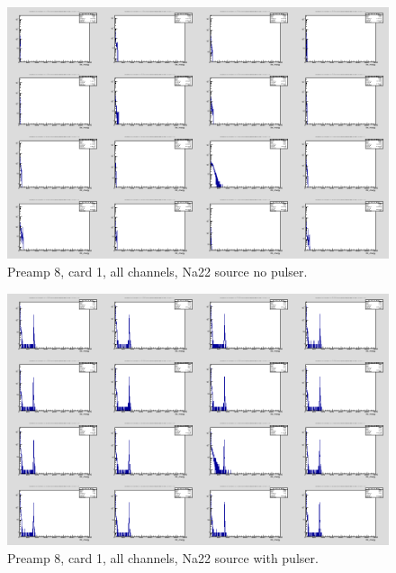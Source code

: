 \documentclass{report}
\begin{document}
\begin{figure}[!htb]
  \includegraphics[width=\linewidth]{dr_latest_test/preamp8_lim_energy_card1_all_no_pulser.png}
  \caption{Preamp 8, card 1, all channels, Na22 source  no pulser.}
\end{figure}
\begin{figure}[!htb]
  \includegraphics[width=\linewidth]{dr_latest_test/preamp8_lim_energy_card1_pulser.png}
  \caption{Preamp 8, card 1, all channels, Na22 source with pulser.}
\end{figure}
\newpage
\clearpage
\end{document}

